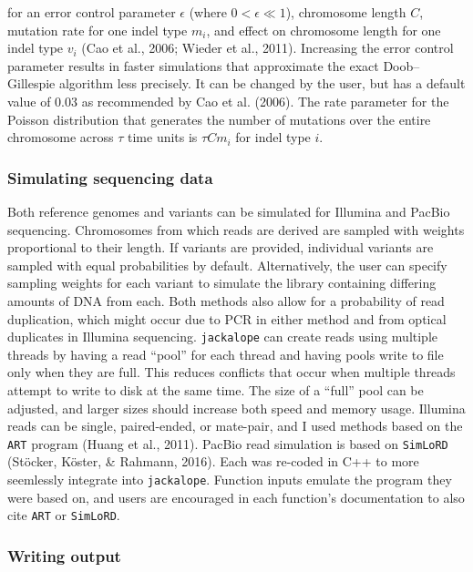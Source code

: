 \documentclass[12pt,]{article}
\begin{document}
for an error control parameter \(\epsilon\) (where \(0 < \epsilon \ll 1\)),
chromosome length \(C\),
mutation rate for one indel type \(m_i\), and
effect on chromosome length for one indel type \(v_i\) (Cao et al., 2006; Wieder et al., 2011).
Increasing the error control parameter results in faster simulations that
approximate the exact Doob--Gillespie algorithm less precisely.
It can be changed by the user, but has a default value of 0.03
as recommended by Cao et al. (2006).
The rate parameter for the Poisson distribution that generates the number of
mutations over the entire chromosome across \(\tau\) time units is \(\tau C m_i\)
for indel type \(i\).

\hypertarget{simulating-sequencing-data}{%
\subsubsection{Simulating sequencing data}\label{simulating-sequencing-data}}

Both reference genomes and variants can be simulated for Illumina and PacBio sequencing.
Chromosomes from which reads are derived are sampled with weights proportional to
their length.
If variants are provided, individual variants are sampled with equal probabilities
by default.
Alternatively, the user can specify sampling weights for each variant
to simulate the library containing differing amounts of DNA from each.
Both methods also allow for a probability of read duplication, which might occur
due to PCR in either method and from optical duplicates in Illumina sequencing.
\texttt{jackalope} can create reads using multiple threads by having a read ``pool'' for
each thread and having pools write to file only when they are full.
This reduces conflicts that occur when multiple threads attempt to write to disk
at the same time.
The size of a ``full'' pool can be adjusted, and larger sizes should increase both
speed and memory usage.
Illumina reads can be single, paired-ended, or mate-pair, and I used
methods based on the \texttt{ART} program (Huang et al., 2011).
PacBio read simulation is based on \texttt{SimLoRD} (Stöcker, Köster, \& Rahmann, 2016).
Each was re-coded in C++ to more seemlessly integrate into \texttt{jackalope}.
Function inputs emulate the program they were based on,
and users are encouraged in each function's documentation to also cite
\texttt{ART} or \texttt{SimLoRD}.

\hypertarget{writing-output}{%
\subsubsection{Writing output}\label{writing-output}}
\end{document}
